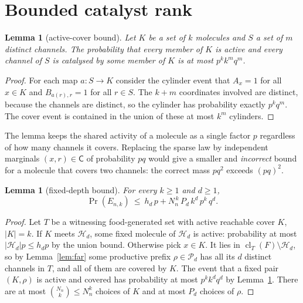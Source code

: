 \documentclass[11pt,a4paper]{article}
\theoremstyle{plain}
\newtheorem{lemma}[theorem]{Lemma}
\theoremstyle{definition}
\theoremstyle{remark}
\newcommand{\cl}{\operatorname{cl}}
\newcommand{\cP}{\mathcal P}
\newcommand{\cH}{\mathcal H}
\begin{document}
\section{Bounded catalyst rank}\label{sec:bounded}

\begin{lemma}[active-cover bound]\label{lem:cover}
Let $K$ be a set of $k$ molecules and $S$ a set of $m$ distinct channels. The probability that every member of $K$ is active and every channel of $S$ is catalysed by some member of $K$ is at most $p^k k^m q^m$.
\end{lemma}

\begin{proof}
For each map $a\colon S\to K$ consider the cylinder event that $A_x=1$ for all $x\in K$ and $B_{a(r),r}=1$ for all $r\in S$. The $k+m$ coordinates involved are distinct, because the channels are distinct, so the cylinder has probability exactly $p^kq^m$. The cover event is contained in the union of these at most $k^m$ cylinders.
\end{proof}

The lemma keeps the shared activity of a molecule as a single factor $p$ regardless of how many channels it covers. Replacing the sparse law by independent marginals $(x,r)\in\mathsf{C}$ of probability $pq$ would give a smaller and \emph{incorrect} bound for a molecule that covers two channels: the correct mass $pq^2$ exceeds $(pq)^2$.

\begin{lemma}[fixed-depth bound]\label{lem:depth}
For every $k\ge1$ and $d\ge1$,
\begin{equation}\label{eq:depth}
\Pr(E_{n,k})\ \le\ h_d\,p+N_n^{\,k}\,P_d\,k^d\,p^k\,q^d .
\end{equation}
\end{lemma}

\begin{proof}
Let $T$ be a witnessing food-generated set with active reachable cover $K$, $|K|=k$. If $K$ meets $\cH_d$, some fixed molecule of $\cH_d$ is active: probability at most $|\cH_d|p\le h_dp$ by the union bound. Otherwise pick $x\in K$. It lies in $\cl_T(F)\setminus\cH_d$, so by Lemma~\ref{lem:far} some productive prefix $\rho\in\cP_d$ has all its $d$ distinct channels in $T$, and all of them are covered by $K$. The event that a fixed pair $(K,\rho)$ is active and covered has probability at most $p^kk^dq^d$ by Lemma~\ref{lem:cover}. There are at most $\binom{N_n}{k}\le N_n^k$ choices of $K$ and at most $P_d$ choices of $\rho$.
\end{proof}
\end{document}
